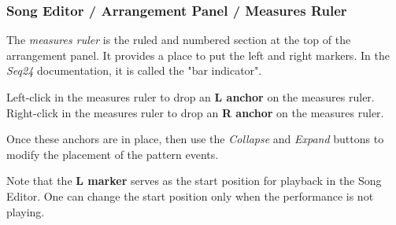 \subsubsection{Song Editor / Arrangement Panel / Measures Ruler}
\label{subsubsec:seq24_song_editor_arrangement_panel_measures_ruler}

   The \textsl{measures ruler} is the ruled and numbered section at the top
   of the arrangement panel.  It provides a place to put the left and right
   markers.  In the \textsl{Seq24} documentation, it is called the "bar
   indicator".

   Left-click in the measures ruler to drop an
   \textbf{L anchor} on the measures ruler.
   Right-click in the measures ruler to drop an
   \textbf{R anchor} on the measures ruler.

   Once these anchors are in place, then use
	the \textsl{Collapse} and \textsl{Expand} buttons to modify the
   placement of the pattern events.

   Note that the \textbf{L marker} serves as the start position for playback
   in the Song Editor.  One can change the start position only when the
   performance is not playing.


